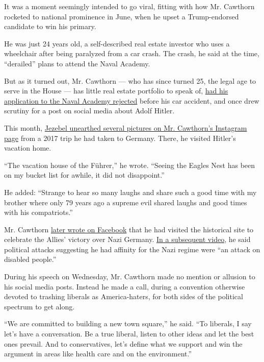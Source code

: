 It was a moment seemingly intended to go viral, fitting with how Mr.
Cawthorn rocketed to national prominence in June, when he upset a
Trump-endorsed candidate to win his primary.

He was just 24 years old, a self-described real estate investor who uses
a wheelchair after being paralyzed from a car crash. The crash, he said
at the time, ``derailed'' plans to attend the Naval Academy.

But as it turned out, Mr. Cawthorn --- who has since turned 25, the
legal age to serve in the House --- has little real estate portfolio to
speak of,
\href{https://www.citizen-times.com/story/news/local/2020/08/12/madison-cawthorns-claim-naval-academy-creates-false-impression/3350634001/}{had
his application to the Naval Academy rejected} before his car accident,
and once drew scrutiny for a post on social media about Adolf Hitler.

This month,
\href{https://theslot.jezebel.com/my-dark-journey-into-the-soul-of-a-model-young-republic-1844324325}{Jezebel
unearthed several pictures on Mr. Cawthorn's Instagram page} from a 2017
trip he had taken to Germany. There, he visited Hitler's vacation home.

``The vacation house of the Führer,'' he wrote. ``Seeing the Eagles Nest
has been on my bucket list for awhile, it did not disappoint.''

He added: ``Strange to hear so many laughs and share such a good time
with my brother where only 79 years ago a supreme evil shared laughs and
good times with his compatriots.''

\begin{quote}
\end{quote}

Mr. Cawthorn
\href{https://www.facebookcorewwwi.onion/Cawthorn2020/posts/188242366048733}{later
wrote on Facebook} that he had visited the historical site to celebrate
the Allies' victory over Nazi Germany.
\href{https://www.facebookcorewwwi.onion/Cawthorn2020/posts/189816922557944}{In
a subsequent video}, he said political attacks suggesting he had
affinity for the Nazi regime were ``an attack on disabled people.''

During his speech on Wednesday, Mr. Cawthorn made no mention or allusion
to his social media posts. Instead he made a call, during a convention
otherwise devoted to trashing liberals as America-haters, for both sides
of the political spectrum to get along.

``We are committed to building a new town square,'' he said. ``To
liberals, I say let's have a conversation. Be a true liberal, listen to
other ideas and let the best ones prevail. And to conservatives, let's
define what we support and win the argument in areas like health care
and on the environment.''

